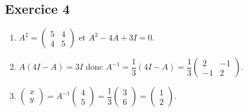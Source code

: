\documentclass[11pt,a4paper]{article}
\begin{document}
\subsection*{Exercice 4}
\begin{enumerate}
  \item $A^2 = \begin{pmatrix}5&4\\4&5\end{pmatrix}$ et $A^2 - 4A + 3I = 0$.
  \item $A(4I - A) = 3I$ donc $A^{-1} = \dfrac13(4I - A) = \dfrac13\begin{pmatrix}2&-1\\-1&2\end{pmatrix}$.
  \item $\begin{pmatrix}x\\y\end{pmatrix} = A^{-1}\begin{pmatrix}4\\5\end{pmatrix} = \dfrac13\begin{pmatrix}3\\6\end{pmatrix} = \begin{pmatrix}1\\2\end{pmatrix}$.
\end{enumerate}
\end{document}
